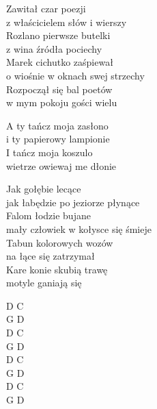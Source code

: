 \begin{text}
    Zawitał czar poezji\\
    z właścicielem słów i wierszy\\
    Rozlano pierwsze butelki\\
    z wina źródła pociechy\\
    Marek cichutko zaśpiewał\\
    o wiośnie w oknach swej strzechy\\
    Rozpoczął się bal poetów\\
    w mym pokoju gości wielu

    \vin A ty tańcz moja zasłono\\
    \vin i ty papierowy lampionie\\
    \vin I tańcz moja koszulo\\
    \vin wietrze owiewaj me dłonie

    Jak gołębie lecące\\
    jak łabędzie po jeziorze płynące\\
    Falom łodzie bujane\\
    mały człowiek w kołysce się śmieje\\
    Tabun kolorowych wozów\\
    na łące się zatrzymał\\
    Kare konie skubią trawę\\
    motyle ganiają się
\end{text}
\begin{chord}
    D C\\
    G D\\
    D C\\
    G D\\
    D C\\
    G D\\
    D C\\
    G D
\end{chord}